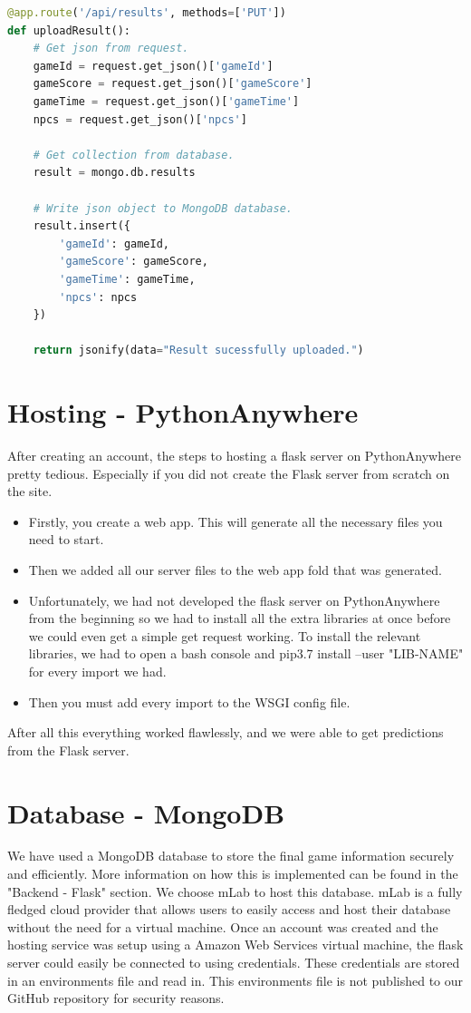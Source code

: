 \begin{lstlisting}[caption={Flask PUT request to Push Data to MongoDB},label={lst:flask3},language=python]
@app.route('/api/results', methods=['PUT'])
def uploadResult():
    # Get json from request.
    gameId = request.get_json()['gameId']
    gameScore = request.get_json()['gameScore']
    gameTime = request.get_json()['gameTime']
    npcs = request.get_json()['npcs']

    # Get collection from database.
    result = mongo.db.results
    
    # Write json object to MongoDB database.
    result.insert({
        'gameId': gameId,
        'gameScore': gameScore,
        'gameTime': gameTime,
        'npcs': npcs
    })

    return jsonify(data="Result sucessfully uploaded.")
\end{lstlisting}

\section{Hosting - PythonAnywhere}
After creating an account, the steps to hosting a flask server on PythonAnywhere pretty tedious. Especially if you did not create the Flask server from scratch on the site.

\begin{itemize}
    \item Firstly, you create a web app. This will generate all the necessary files you need to start.
    \item Then we added all our server files to the web app fold that was generated.
    \item Unfortunately, we had not developed the flask server on PythonAnywhere from the beginning so we had to install all the extra libraries at once before we could even get a simple get request working. To install the relevant libraries, we had to open a bash console and pip3.7 install --user "LIB-NAME" for every import we had.
    \item Then you must add every import to the WSGI config file.
\end{itemize}
After all this everything worked flawlessly, and we were able to get predictions from the Flask server.

\section{Database - MongoDB}
We have used a MongoDB database to store the final game information securely and efficiently. More information on how this is implemented can be found in the "Backend - Flask" section. We choose mLab to host this database. mLab is a fully fledged cloud provider that allows users to easily access and host their database without the need for a virtual machine. Once an account was created and the hosting service was setup using a Amazon Web Services virtual machine, the flask server could easily be connected to using credentials. These credentials are stored in an environments file and read in. This environments file is not published to our GitHub repository for security reasons. 


